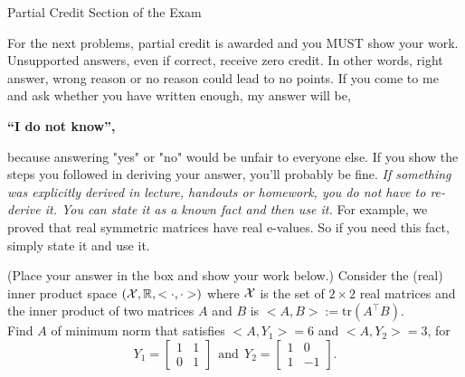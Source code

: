 \documentclass[letterpaper]{article}
\newcommand{\real}{\mathbb R}  %
\begin{document}
\newpage

\vspace*{.7in}
\begin{center}
\huge

Partial Credit Section of the Exam

\end{center}



\vspace*{1in}

{\Large  For the next problems, partial credit is awarded and you MUST show your work. Unsupported answers, even if correct, receive zero credit. In other words, right answer, wrong
reason or no reason could lead to no points. If you come to me and ask whether you have written enough, my answer will be,
\begin{center}
\bf ``I do not know'',
\end{center}
 because answering "yes" or "no"  would be unfair to everyone else. If you show the steps you followed in deriving your answer, you'll probably be fine.
  \emph{If something was explicitly derived in lecture, handouts or homework, you do not have to re-derive it. You can state it as a known fact and then use it.} For example, we proved that real symmetric matrices have real e-values. So if you need this fact, simply state it and use it.}

%
%



  \newpage


 (Place your answer in the box and show your work below.) Consider the (real) inner product space ${({\cal X}, \real, <\cdot, \cdot>)}$  where ${\cal X}$ is the set of $2 \times 2$ real matrices and the inner product of two matrices $A$ and $B$ is ${<A,B>:= \mathrm{tr}(A^\top B)}$. \\

Find $A$ of minimum norm that satisfies $<A,Y_1> = 6$ and $<A,Y_2> = 3$, for\\

$$Y_1=\left[ \begin{array}{rr}1&1\\0&1 \end{array} \right]~~\text{and}~~ Y_2= \left[ \begin{array}{rr}1 & 0\\1&-1 \end{array} \right].$$\\
\end{document}
